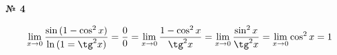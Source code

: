 \documentclass{article}
\begin{document}
\textbf{№ 4} 
\large

$$ \lim\limits_{x \to 0} \frac{\sin{(1-\cos^2{x})}}{\ln{(1=\tg^2{x})}}
= \frac{0}{0}
= \lim\limits_{x \to 0} \frac{1-\cos^2{x}}{\tg^2{x}} 
= \lim\limits_{x \to 0} \frac{\sin^2{x}}{\tg^2{x}} 
= \lim\limits_{x \to 0} \cos^2{x} 
= 1 $$  
\end{document}
